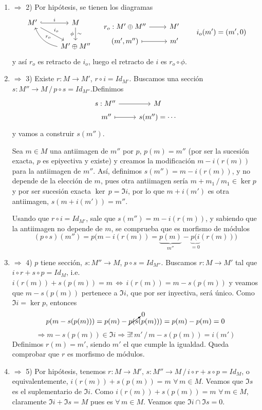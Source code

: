 \begin{dem}
    \begin{enumerate}[1)]
        \item $\Rightarrow$ 2) Por hip\'otesis, se tienen los diagramas
        $$ \bt M ' \arrow[hook]{r}{i} \arrow[rd, "i_o"] & M \arrow[d, "\sim", "\phi"'] \\ & M' \oplus M'' \arrow[bend left=10mm, swap]{lu}{r_o} \et \quad \bt r_o : M' \oplus M'' \arrow{r} & M' \\[-5mm] (m',m'') \arrow[mapsto]{r} & m' \et \qquad i_o(m') = (m', 0)  $$
        y as\'i  $r_o$ es retracto de $i_o$, luego el retracto de $i$ es $r_o \circ \phi$.
        \item $\Rightarrow$ 3) Existe $r: M \longrightarrow M'$, $r\circ i = Id_{M'}$. Buscamos una secci\'on $s: M'' \longrightarrow M \, / \, p\circ s = Id_{M''}$.Definimos 
        $$\bt s: M'' \arrow{r} & M \\[-5mm] \, \, m'' \arrow[mapsto]{r} & s(m'') = \cdots \et$$
        y vamos a construir $s(m'')$.

        Sea $m \in M$ una antiimagen de $m''$ por $p$, $p(m)=m''$ (por ser la sucesi\'on exacta, $p$ es epiyectiva y existe) y creamos la modificaci\'on $m - i(r(m))$ para la antiimagen de $m''$. As\'i, definimos $s(m'') = m - i(r(m))$, y no depende de la elecci\'on de $m$, pues otra antiimagen ser\'ia $m+m_1 \, / \, m_1 \in \ker  p$ y por ser sucesi\'on exacta $\ker\, p = \Im i$, por lo que $m+i(m')$ es otra antiimagen, $s(m + i(m'))=m''$. 

        Usando que $r\circ i = Id_{M'}$, sale que $s(m'') = m-i(r(m))$, y sabiendo que la antiimagen no depende de $m$, se comprueba que es morfismo de m\'odulos 
        $$(p \circ s)(m'') = p(m-i(r(m)) = \underbrace{p(m)}_{m''} - \underbrace{p ( i }_{=0}{(r(m)))}$$
        \item $\Rightarrow$ 4) $p$ tiene secci\'on, $s: M'' \longrightarrow M$, $p \circ s = Id_{M''}$. Buscamos $r:M \longrightarrow M'$ tal que $i \circ r + s \circ p = Id_{M}$, i.e. $i(r(m)) + s(p(m)) = m \, \iff \, i(r(m)) = m - s(p(m))$ y veamos que $m-s(p(m))$ pertenece a $\Im i$, que por ser inyectiva, ser\'a \'unico. Como $\Im i = \ker  p$, entonces $$p(m-s(p(m))) = p(m) - \cancelto{0}{p(s}(p(m))) = p(m) - p(m) = 0 $$ $$\Rightarrow m-s(p(m)) \in \Im i \Rightarrow \exists ! \, m' \, / \, m-s(p(m)) = i (m')$$
         Definimos $r(m) = m'$, siendo $m'$ el que cumple la igualdad. Queda comprobar que $r$ es morfismo de m\'odulos.

        \item $\Rightarrow$ 5) Por hip\'otesis, tenemos $r: M \longrightarrow M', \, s: M'' \longrightarrow M \, / \, i \circ r + s \circ p =Id_M$, o equivalentemente, $i(r(m)) + s(p(m)) = m \, \,  \forall \, m \in M$. Veamos que $\Im s$ es el suplementario de $\Im i$. Como $i(r(m)) + s(p(m)) = m \, \,  \forall \, m \in M$, claramente $\Im i + \Im s = M$ pues es $\forall \, m \in M$. Veamos que $\Im i \cap \Im s = 0$.


\end{enumerate}
\end{dem}
